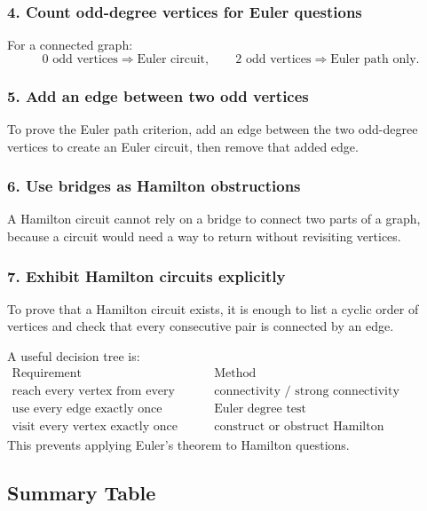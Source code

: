 \subsubsection*{4. Count odd-degree vertices for Euler questions}
For a connected graph:
\[
0\text{ odd vertices}\Rightarrow \text{Euler circuit},
\qquad
2\text{ odd vertices}\Rightarrow \text{Euler path only}.
\]

\subsubsection*{5. Add an edge between two odd vertices}
To prove the Euler path criterion, add an edge between the two odd-degree vertices to create an Euler circuit, then remove that added edge.

\subsubsection*{6. Use bridges as Hamilton obstructions}
A Hamilton circuit cannot rely on a bridge to connect two parts of a graph, because a circuit would need a way to return without revisiting vertices.

\subsubsection*{7. Exhibit Hamilton circuits explicitly}
To prove that a Hamilton circuit exists, it is enough to list a cyclic order of vertices and check that every consecutive pair is connected by an edge.

\begin{extension}[title={Traversal problem decision tree}]
A useful decision tree is:
\[
\begin{array}{c|c}
\text{Requirement} & \text{Method} \\ \hline
\text{reach every vertex from every other} & \text{connectivity / strong connectivity} \\
\text{use every edge exactly once} & \text{Euler degree test} \\
\text{visit every vertex exactly once} & \text{construct or obstruct Hamilton path/circuit}
\end{array}
\]
This prevents applying Euler's theorem to Hamilton questions.
\end{extension}

\subsection{Summary Table}

